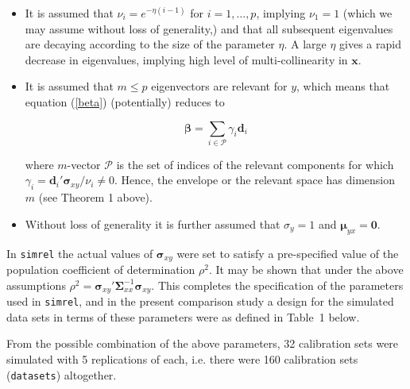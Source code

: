 \documentclass[num-refs]{wiley-article}
\begin{document}
\begin{itemize}[label=$\triangleright$]
\item It is assumed that $\nu_{i} = e^{-\eta(i-1)}$ for $i=1, \ldots, p$, implying $\nu_1=1$ (which we may assume without loss of generality,) and that all subsequent eigenvalues are decaying according to the size of the parameter $\eta$.  A large $\eta$ gives a rapid decrease in eigenvalues, implying high level of multi-collinearity in $\boldsymbol{x}$.
\item It is assumed that $m \le p$ eigenvectors are relevant for $y$, which means that equation (\ref{beta}) (potentially) reduces to

  \begin{equation}
    \label{eq:relevant-beta}
    \bm{\beta} = \sum_{i \in \mathcal{P}}{\gamma_i \bm{d}_i}
  \end{equation}

  where $m$-vector $\mathcal{P}$ is the set of indices of the relevant components for which $\gamma_i = \bm{d}_i' \bm{\sigma}_{xy}/\nu_i \ne 0$. Hence, the envelope or the relevant space has dimension $m$ (see Theorem 1 above).
\item Without loss of generality it is further assumed that $\sigma_y=1$ and $\boldsymbol{\mu}_{yx}=\boldsymbol{0}$.
\end{itemize}

In {\tt simrel} the actual values of $\boldsymbol{\sigma}_{xy}$ were set to satisfy a pre-specified value of the population coefficient of determination $\rho^2$. It may be shown that under the above assumptions $\rho^2=\boldsymbol{\sigma}_{xy}'\boldsymbol{\Sigma}_{xx}^{-1}\boldsymbol{\sigma}_{xy}$. This completes the specification of the parameters used in {\tt simrel}, and in the present comparison study a design for the simulated data sets in terms of these parameters were as defined in Table~1 below.

From the possible combination of the above parameters, 32 calibration sets were simulated with 5 replications of each, i.e. there were 160 calibration sets ({\tt datasets}) altogether.

\bigskip

\end{document}
